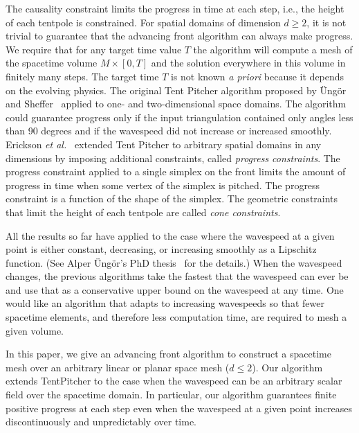 \documentclass[twocolumn]{article}
\def\sp{\ensuremath{M}}
\def\etal{\textsl{et al.}}
\def\Ungor{\"Ung\"or}
\begin{document}
The causality constraint limits the progress in time at each step,
i.e., the height of each tentpole is constrained.  For spatial domains
of dimension $d \ge 2$, it is not trivial to guarantee that the
advancing front algorithm can always make progress.  We require that
for any target time value $T$ the algorithm will compute a mesh of the
spacetime volume $\sp \times [0,T]$ and the solution everywhere in
this volume in finitely many steps.  The target time $T$ is not known
\textit{a priori} because it depends on the evolving physics.
The original Tent Pitcher algorithm proposed by \Ungor{} and
Sheffer~\cite{ungor00tentpitcher} applied to one- and two-dimensional
space domains.  The algorithm could guarantee progress only if the
input triangulation contained only angles less than 90 degrees and if
the wavespeed did not increase or increased smoothly.  Erickson
\etal~\cite{erickson02building} extended Tent Pitcher to arbitrary
spatial domains in any dimensions by imposing additional constraints,
called \emph{progress constraints}.  The progress constraint applied
to a single simplex on the front limits the amount of progress in time
when some vertex of the simplex is pitched.  The progress constraint
is a function of the shape of the simplex.  The geometric constraints
that limit the height of each tentpole are called \emph{cone
  constraints}.

All the results so far have applied to the case where the wavespeed at
a given point is either constant, decreasing, or increasing smoothly
as a Lipschitz function.  (See Alper \Ungor{}'s PhD
thesis~\cite{ungor02phd} for the details.)  When the wavespeed
changes, the previous algorithms take the fastest that the wavespeed
can ever be and use that as a conservative upper bound on the
wavespeed at any time.  One would like an algorithm that adapts to
increasing wavespeeds so that fewer spacetime elements, and therefore
less computation time, are required to mesh a given volume.


In this paper, we give an advancing front algorithm to construct a
spacetime mesh over an arbitrary linear or planar space mesh ($d \le
2$).  Our algorithm extends TentPitcher to the case when the wavespeed
can be an arbitrary scalar field over the spacetime domain.  In
particular, our algorithm guarantees finite positive progress at each
step even when the wavespeed at a given point increases
discontinuously and unpredictably over time.
\end{document}
